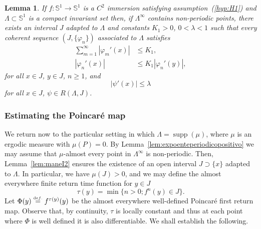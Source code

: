 \documentclass[12pt,a4paper,twoside]{article}
\theoremstyle{plain}
\newtheorem{lemma}[theorem]{Lemma}
\theoremstyle{definition}
\newcommand{\T}{{\mathbb{S}^1}}
\newcommand{\eqdef}{\stackrel{\scriptscriptstyle\textrm def.}{=}}
\begin{document}
\begin{lemma}
 \label{lem:maneI3} 
 If $f:\T\to\T$ is a $C^2$ immersion satisfying assumption~\emph{(\ref{hyp:H1})} and
$\Lambda\subset\T$ is a compact invariant set then, if
$\Lambda^\infty$ contains non-periodic points, there
exists an interval $J$ adapted to $\Lambda$ and constants
$K_1>0$, $0<\lambda<1$ such that every coherent sequence
$(J,\{\varphi_n\})$ associated to $\Lambda$ satisfies
\begin{align}
\sum_{m=1}^{\infty}\left|\varphi_m'(x)\right|
    &\le K_1, \tag{2}\\
\left|\varphi_n'(x)\right|
    &\le K_1\left|\varphi_n'(y)\right|, \tag{3}
\end{align}
for all $x\in J$, $y\in J$, $n\ge 1$, and
\begin{equation}
|\psi'(x)|\le\lambda
\tag{4}
\end{equation}
for all $x\in J$, $\psi\in R(\Lambda,J)$.
\end{lemma}

\subsubsection{Estimating the Poincaré map}


We return now to the particular setting in which $\Lambda=\operatorname{supp}(\mu)$, where $\mu$ is an ergodic measure with $\mu(P)=0$. By Lemma~\ref{lem:expoenteperiodicopositivo} we may assume that $\mu$-almost every point in $\Lambda^\infty$ is non-periodic. Then, Lemma~\ref{lem:maneI2} ensures the existence of an open interval $J\supset\{x\}$ adapted to $\Lambda$. In particular, we have $\mu(J)>0$, and we may define the almost everywhere finite return time function for $y\in J$
\[
\tau(y)=\min\{n>0;f^n(y)\in J\}.
\]
Let $\Phi(y)\eqdef f^{\tau(y)}(y)$ be the almost everywhere well-defined Poincaré first return map. Observe that, by continuity, $\tau$ is locally constant and thus at each point where $\Phi$ is well defined it is also differentiable. We shall establish the following.
\end{document}
